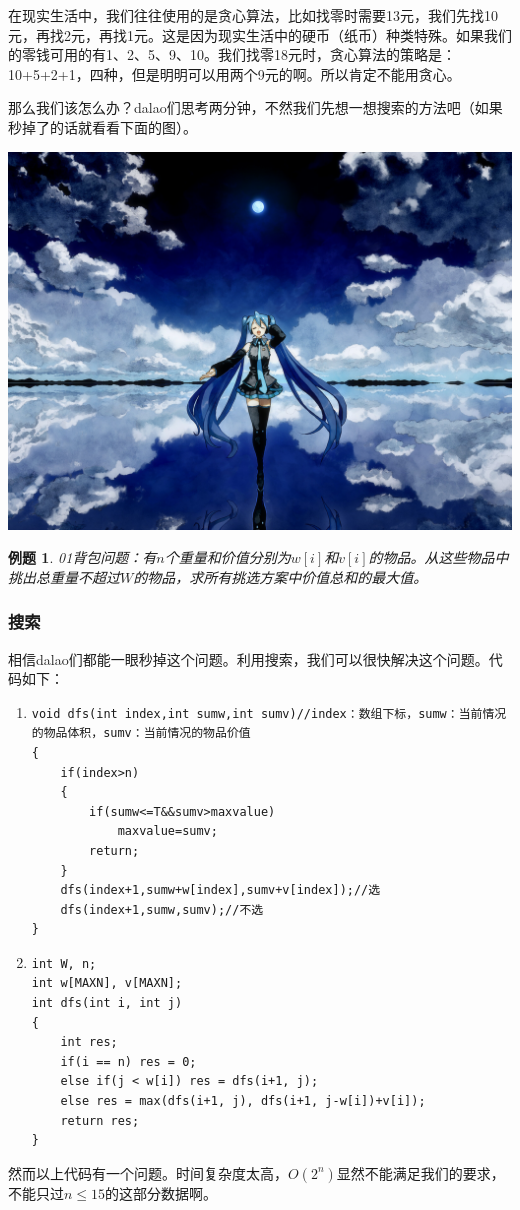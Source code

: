 \documentclass{article}
\newtheorem{example}{例题}[subsection]
\theoremstyle{nonumberplain}
\begin{document}
在现实生活中，我们往往使用的是贪心算法，比如找零时需要13元，我们先找10元，再找2元，再找1元。这是因为现实生活中的硬币（纸币）种类特殊。如果我们的零钱可用的有1、2、5、9、10。我们找零18元时，贪心算法的策略是：10+5+2+1，四种，但是明明可以用两个9元的啊。所以肯定不能用贪心。

那么我们该怎么办？dalao们思考两分钟，不然我们先想一想搜索的方法吧（如果秒掉了的话就看看下面的图）。

\begin{center}\includegraphics[scale=0.8]{6081163_p0.jpg}\end{center}
\newpage
\begin{example}\rm{01}背包问题：有$n$个重量和价值分别为$w[i]$和$v[i]$的物品。从这些物品中挑出总重量不超过$W$的物品，求所有挑选方案中价值总和的最大值。\end{example}

\subsubsection{搜索}
相信dalao们都能一眼秒掉这个问题。利用搜索，我们可以很快解决这个问题。代码如下：
\begin{enumerate}
\item \begin{verbatim}
void dfs(int index,int sumw,int sumv)//index：数组下标，sumw：当前情况的物品体积，sumv：当前情况的物品价值
{ 
    if(index>n)  
    {  
        if(sumw<=T&&sumv>maxvalue)  
            maxvalue=sumv;  
        return;  
    }  
    dfs(index+1,sumw+w[index],sumv+v[index]);//选
    dfs(index+1,sumw,sumv);//不选
}\end{verbatim}
\item \begin{verbatim}  
int W, n;
int w[MAXN], v[MAXN];  
int dfs(int i, int j)
{  
    int res;  
    if(i == n) res = 0;   
    else if(j < w[i]) res = dfs(i+1, j);  
    else res = max(dfs(i+1, j), dfs(i+1, j-w[i])+v[i]);  
    return res;  
}
\end{verbatim}
\end{enumerate}
然而以上代码有一个问题。时间复杂度太高，$O(2^n)$显然不能满足我们的要求，不能只过$n\leq15$的这部分数据啊。
\end{document}
